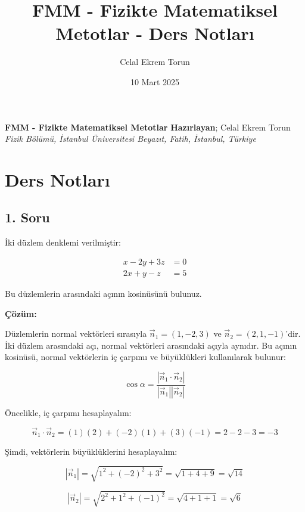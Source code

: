 \documentclass[]{fenbil}
\title{FMM - Fizikte Matematiksel Metotlar - Ders Notları}
\author{Celal Ekrem Torun}
\date{10 Mart 2025}
\begin{document}
\begin{minipage}{0.15\textwidth}
{}
\end{minipage}
\hspace{25pt}
\begin{minipage}{0.75\textwidth}
\vspace{5mm}
\Large{\textbf{FMM - Fizikte Matematiksel Metotlar}}
\vspace{3mm}
\large{\textbf{Hazırlayan}; Celal Ekrem Torun}
\vspace{2mm}
\fontsize{0.35cm}{0.5cm}\selectfont \textit{Fizik Bölümü, İstanbul Üniversitesi\newline
Beyazıt, Fatih, İstanbul, Türkiye}
\end{minipage}
\small

\section{Ders Notları}

\subsection*{1. Soru}

İki düzlem denklemi verilmiştir:

\begin{align*}
x - 2y + 3z &= 0 \\
2x + y - z &= 5
\end{align*}

Bu düzlemlerin arasındaki açının kosinüsünü bulunuz.

\textbf{Çözüm:}

Düzlemlerin normal vektörleri sırasıyla $\vec{n}_1 = (1, -2, 3)$ ve $\vec{n}_2 = (2, 1, -1)$'dir. İki düzlem arasındaki açı, normal vektörleri arasındaki açıyla aynıdır. Bu açının kosinüsü, normal vektörlerin iç çarpımı ve büyüklükleri kullanılarak bulunur:

\[
\cos{\alpha} = \frac{|\vec{n}_1 \cdot \vec{n}_2|}{|\vec{n}_1| |\vec{n}_2|}
\]

Öncelikle, iç çarpımı hesaplayalım:

\[
\vec{n}_1 \cdot \vec{n}_2 = (1)(2) + (-2)(1) + (3)(-1) = 2 - 2 - 3 = -3
\]

Şimdi, vektörlerin büyüklüklerini hesaplayalım:

\[
|\vec{n}_1| = \sqrt{1^2 + (-2)^2 + 3^2} = \sqrt{1 + 4 + 9} = \sqrt{14}
\]

\[
|\vec{n}_2| = \sqrt{2^2 + 1^2 + (-1)^2} = \sqrt{4 + 1 + 1} = \sqrt{6}
\]
\end{document}

